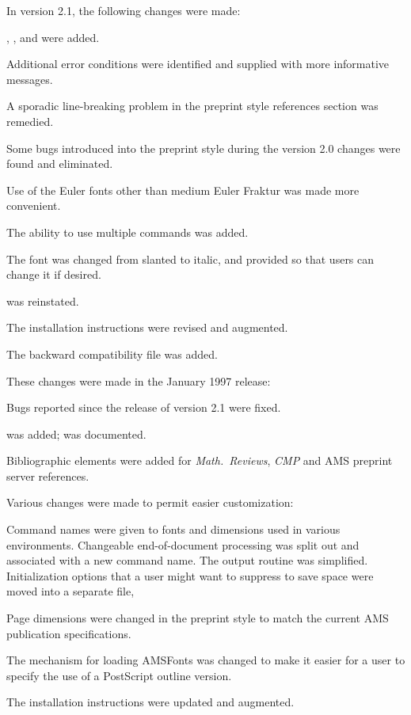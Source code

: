\medskip
In version 2.1, the following changes were made:
\roster
\item {}, , and  were added.
\item Additional error conditions were identified and supplied with more
  informative messages.
\item A sporadic line-breaking problem in the preprint style references
  section was remedied.
\item Some bugs introduced into the preprint style during the
 version 2.0 changes were found and eliminated.
\item Use of the Euler fonts other than medium Euler Fraktur was
  made more convenient.
\item The ability to use multiple  commands was added.
\item The  font was changed from slanted to italic, and
   provided so that users can change it if desired.
\item {} was reinstated.
\item The installation instructions were revised and augmented.
\item The backward compatibility file  was added.
\endroster

\medskip
These changes were made in the January 1997 release:
\roster
\item Bugs reported since the release of version 2.1 were fixed.
\item {} was added;  was documented.
\item Bibliographic elements were added for {\it Math.\ Reviews},
  {\it CMP\/} and AMS preprint server references.
\item Various changes were made to permit easier customization:

   Command names were given to fonts and dimensions used
    in various environments.
   Changeable end-of-document processing was split out
    and associated with a new command name.
   The output routine was simplified.
   Initialization options that a user might want to
    suppress to save space were moved into a separate file,

\item Page dimensions were changed in the preprint style to match the
  current AMS publication specifications.
\item The mechanism for loading AMSFonts was changed to make it easier
  for a user to specify the use of a PostScript outline version.
\item The installation instructions were updated and augmented.
\endroster

